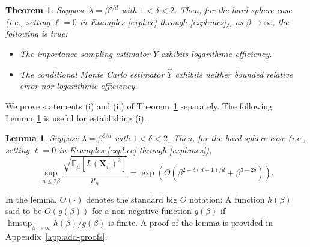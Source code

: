 \documentclass[pdflatex, sn-mathphys-ay]{sn-jnl}%
\renewcommand{\v}[1]{\boldsymbol{#1}}
\newcommand{\ee}{\mathbb{E}}
\newcommand{\mX}{\v{X}}
\newcommand{\lt}{\left}
\newcommand{\rt}{\right}
\newcommand{\wt}{\widetilde}
\newcommand{\wh}{\widehat}
\newtheorem{lemma}{Lemma}
\theoremstyle{thmstyleone}%
\newtheorem{theorem}{Theorem}%
\theoremstyle{thmstyletwo}%
\theoremstyle{thmstylethree}%
\begin{document}
\begin{theorem}
    \label{thm:le_Ytilde}
    Suppose $\lambda = \beta^{\delta/d}$ with $1 < \delta  < 2$. Then, {  for the hard-sphere case (i.e., setting $\ell = 0$ in Examples \ref{expl:ec} through \ref{expl:mcs}),}  as $\beta \to \infty$, the following is true:
    \begin{itemize}
        \item[(i)]  The importance sampling estimator $\wt Y$ exhibits logarithmic efficiency. 
        \item[(ii)] The conditional Monte Carlo estimator $\wh Y$ exhibits neither {  bounded relative error} nor logarithmic efficiency. 
    \end{itemize}
\end{theorem}
We prove statements (i) and (ii) of Theorem~\ref{thm:le_Ytilde} separately. The following Lemma~\ref{lem:upper-bound} is useful for establishing (i).


\begin{lemma}
\label{lem:upper-bound}
Suppose $\lambda = \beta^{\delta/d}$ with $1 < \delta  < 2$. Then, {  for the hard-sphere case (i.e., setting $\ell = 0$ in Examples \ref{expl:ec} through \ref{expl:mcs}),} 
\[
\sup_{n \leq 2\beta} \frac{\sqrt{\ee_\mu[L(\mX_n)^2]}}{p_n} = \exp\lt( O\lt(\beta^{2 - {\delta(d+1)/d}} + \beta^{3 - 2\delta} \rt)\rt).
\] 
\end{lemma}
In the lemma, $O(\cdot)$ denotes the standard big $O$ notation: A function $h(\beta)$ said to be $O(g(\beta))$ for a non-negative function $g(\beta)$ if ${\limsup_{\beta \to \infty} h(\beta)/g(\beta)}$ is finite. A proof of the lemma is  provided in Appendix~\ref{app:add-proofs}. 
 
\end{document}
